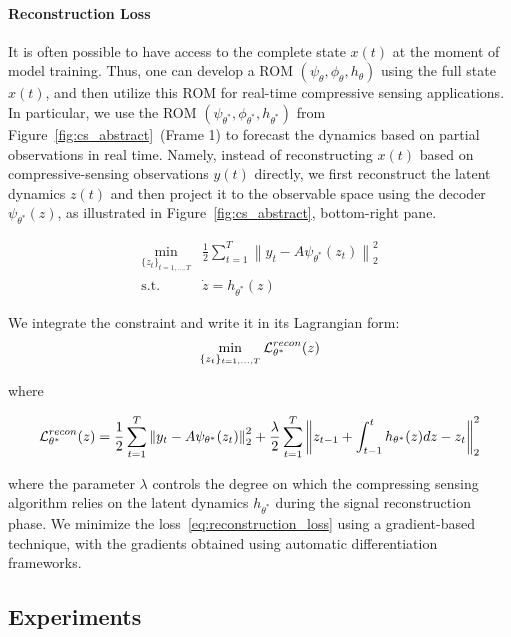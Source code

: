 \paragraph{Reconstruction Loss} It is often possible to have access to the complete state $x(t)$ at the moment of model training. Thus, one can develop a ROM $(\psi_\theta, \phi_\theta, h_\theta)$ using the full state $x(t)$, and then utilize this ROM for real-time compressive sensing applications. In particular, we use the ROM $(\psi_{\theta^*}, \phi_{\theta^*}, h_{\theta^*})$ from Figure~\ref{fig:cs_abstract}~(Frame 1) to forecast the dynamics based on partial observations in real time. Namely, instead of reconstructing $x(t)$ based on compressive-sensing observations $y(t)$ directly, we first reconstruct the latent dynamics $z(t)$ and then project it to the observable space using the decoder $\psi_{\theta^*}(z)$, as illustrated in Figure~\ref{fig:cs_abstract}, bottom-right pane. 

\begin{align}
    \label{eq:reconstruction_problem_differential}
    \min_{\{z_t\}_{t=1, \dots, T}} & \frac{1}{2}\sum_{t=1}^T \left\|y_t - A\psi_{\theta^*}(z_t)\right\|_2^2 \\
    \text{s.t. } & \dot{z} = h_{\theta^*}(z)
\end{align}

We integrate the constraint and write it in its Lagrangian form:
\begin{align}
\label{eq:reconstruction_problem_integral}
    \min_{\{z_t\}_{t=1, \dots, T}} \operatorname{\mathcal{L}}_{\theta^*}^{recon}(z)
\end{align}

where 

\begin{equation}
    \label{eq:reconstruction_loss}
     \operatorname{\mathcal{L}}_{\theta^*}^{recon}(z) = \frac{1}{2}\sum_{t=1}^T \left\|y_t - A\psi_{\theta^*}(z_t)\right\|_2^2 + \frac{\lambda}{2} \sum_{t=1}^T \left\|z_{t-1} + \int_{t-1}^{t}h_{\theta^*}(z)dz - z_t\right\|_2^2
\end{equation}

where the parameter $\lambda$ controls the degree on which the compressing sensing algorithm relies on the latent dynamics $h_{\theta^*}$ during the signal reconstruction phase. We minimize the loss~\eqref{eq:reconstruction_loss} using a gradient-based technique, with the gradients obtained using automatic differentiation frameworks. 

\subsection{Experiments}


